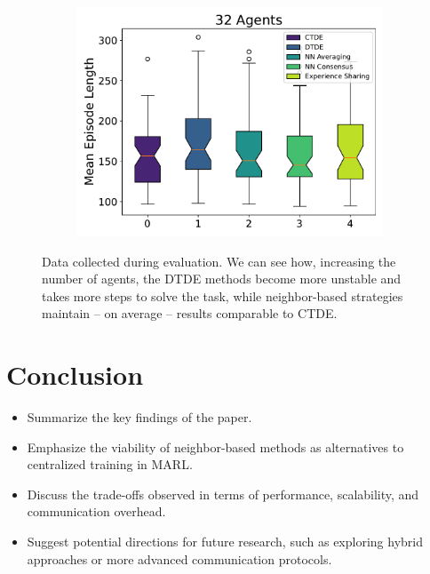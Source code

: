 \documentclass[sigconf]{acmart}
\begin{document}
\begin{figure}[htb]
\begin{subfigure}[b]{0.3\textwidth}
      \centering
      \includegraphics[width=\textwidth]{figures/mean-time-comparison-32-agents.pdf}
  \end{subfigure}
  \caption{ Data collected during evaluation.
  We can see how, increasing the number of agents, the DTDE methods become more unstable and takes more 
  steps to solve the task, while neighbor-based strategies maintain -- on average -- results comparable to CTDE.
  }
  \label{fig:time-eval}
\end{figure}


\section{Conclusion}\label{sec:conclusion}
\begin{itemize}
\item Summarize the key findings of the paper.
\item Emphasize the viability of neighbor-based methods as alternatives to centralized training in MARL.
\item Discuss the trade-offs observed in terms of performance, scalability, and communication overhead.
\item Suggest potential directions for future research, such as exploring hybrid approaches or more advanced communication protocols.
\end{itemize}



 
\end{document}
